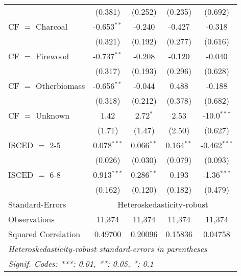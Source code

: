 \begin{table}[htbp!]
\begin{adjustbox}{width = 1\textwidth, max height = 0.95\textheight, center}
\begin{threeparttable}[b]
\begin{tabular}{lcccc}
                                 & (0.381)            & (0.252)            & (0.235)        & (0.692)\\   
            CF $=$ Charcoal      & -0.653$^{**}$      & -0.240             & -0.427         & -0.318\\   
                                 & (0.321)            & (0.192)            & (0.277)        & (0.616)\\   
            CF $=$ Firewood      & -0.737$^{**}$      & -0.208             & -0.120         & -0.040\\   
                                 & (0.317)            & (0.193)            & (0.296)        & (0.628)\\   
            CF $=$ Otherbiomass  & -0.656$^{**}$      & -0.044             & 0.488          & -0.188\\   
                                 & (0.318)            & (0.212)            & (0.378)        & (0.682)\\   
            CF $=$ Unknown       & 1.42               & 2.72$^{*}$         & 2.53           & -10.0$^{***}$\\   
                                 & (1.71)             & (1.47)             & (2.50)         & (0.627)\\   
            ISCED $=$ 2-5        & 0.078$^{***}$      & 0.066$^{**}$       & 0.164$^{**}$   & -0.462$^{***}$\\   
                                 & (0.026)            & (0.030)            & (0.079)        & (0.093)\\   
            ISCED $=$ 6-8        & 0.913$^{***}$      & 0.286$^{**}$       & 0.193          & -1.36$^{***}$\\   
                                 & (0.162)            & (0.120)            & (0.182)        & (0.479)\\   
            \midrule 
            Standard-Errors & \multicolumn{4}{c}{Heteroskedasticity-robust} \\ 
            Observations         & 11,374             & 11,374             & 11,374         & 11,374\\  
            Squared Correlation  & 0.49700            & 0.20096            & 0.15836        & 0.04758\\  
            \midrule \midrule
            \multicolumn{5}{l}{\emph{Heteroskedasticity-robust standard-errors in parentheses}}\\
            \multicolumn{5}{l}{\emph{Signif. Codes: ***: 0.01, **: 0.05, *: 0.1}}\\
         \end{tabular}
         

\end{threeparttable}
\end{adjustbox}
\end{table}
